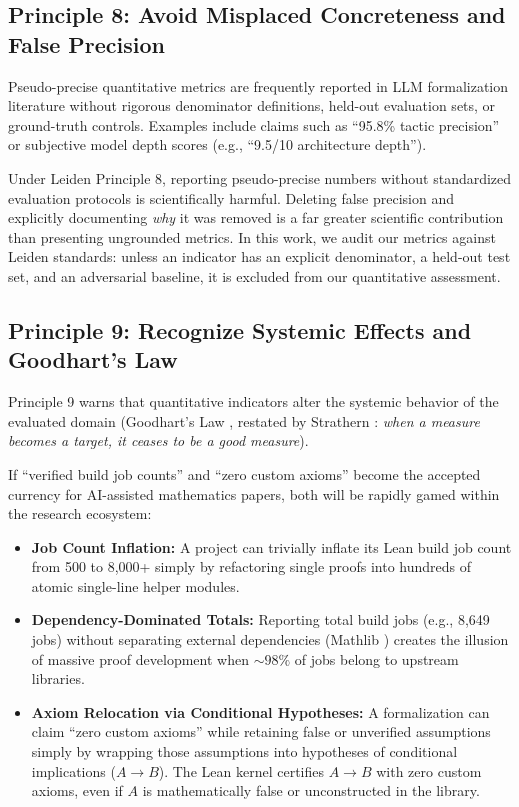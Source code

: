 \documentclass[11pt,a4paper]{article}
\theoremstyle{definition}
\theoremstyle{remark}
\begin{document}
\subsection{Principle 8: Avoid Misplaced Concreteness and False Precision}

Pseudo-precise quantitative metrics are frequently reported in LLM formalization literature without rigorous denominator definitions, held-out evaluation sets, or ground-truth controls. Examples include claims such as ``95.8\% tactic precision'' or subjective model depth scores (e.g., ``9.5/10 architecture depth''). 

Under Leiden Principle 8, reporting pseudo-precise numbers without standardized evaluation protocols is scientifically harmful. Deleting false precision and explicitly documenting \emph{why} it was removed is a far greater scientific contribution than presenting ungrounded metrics. In this work, we audit our metrics against Leiden standards: unless an indicator has an explicit denominator, a held-out test set, and an adversarial baseline, it is excluded from our quantitative assessment.

\subsection{Principle 9: Recognize Systemic Effects and Goodhart's Law}

Principle 9 warns that quantitative indicators alter the systemic behavior of the evaluated domain (Goodhart's Law \cite{Goodhart1975}, restated by Strathern \cite{Strathern1997}: \emph{when a measure becomes a target, it ceases to be a good measure}).

If ``verified build job counts'' and ``zero custom axioms'' become the accepted currency for AI-assisted mathematics papers, both will be rapidly gamed within the research ecosystem:
\begin{itemize}[leftmargin=2em]
  \item \textbf{Job Count Inflation:} A project can trivially inflate its Lean build job count from 500 to 8,000+ simply by refactoring single proofs into hundreds of atomic single-line helper modules.
  \item \textbf{Dependency-Dominated Totals:} Reporting total build jobs (e.g., 8,649 jobs) without separating external dependencies (Mathlib \cite{MouraUllrich2021}) creates the illusion of massive proof development when $\sim 98\%$ of jobs belong to upstream libraries.
  \item \textbf{Axiom Relocation via Conditional Hypotheses:} A formalization can claim ``zero custom axioms'' while retaining false or unverified assumptions simply by wrapping those assumptions into hypotheses of conditional implications ($A \to B$). The Lean kernel certifies $A \to B$ with zero custom axioms, even if $A$ is mathematically false or unconstructed in the library.
\end{itemize}
\end{document}
